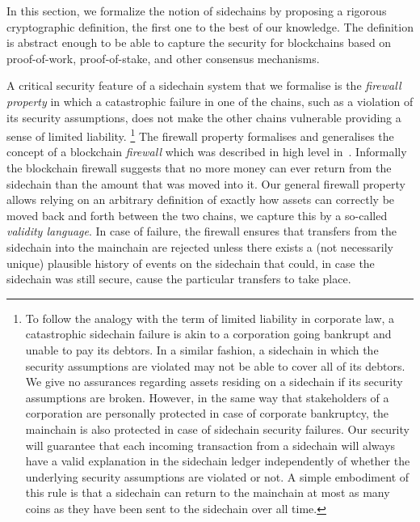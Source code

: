 In this section, we formalize the notion of sidechains by proposing a rigorous
cryptographic definition, the first one to the best of our knowledge. The
definition is abstract enough to be able to capture the security for blockchains
based on proof-of-work, proof-of-stake, and other consensus mechanisms.

A critical security feature of a  sidechain system that we formalise
is the \textit{firewall property} in
which a catastrophic failure in one of the chains, such as a violation of its
security assumptions, does not make the other chains vulnerable providing a
sense of limited liability.%
\footnote{To follow the analogy with the term of limited liability in corporate
law, a catastrophic sidechain failure is akin to a corporation going bankrupt
and unable to pay its debtors. In a similar fashion, a sidechain in which the
security assumptions are violated may not be able to cover all of its debtors.
We give no assurances regarding assets residing on a sidechain if its
security assumptions are broken.
 However, in the same way that stakeholders of a corporation are personally
protected in case of corporate bankruptcy, the mainchain is also protected in
case of sidechain security failures. Our security will guarantee that
each incoming transaction from a sidechain will always have a valid
explanation  in the sidechain ledger
independently of whether the underlying
security assumptions are violated or not. A simple embodiment of this rule
is that a sidechain can return to the mainchain at most as many coins as they have been sent to the sidechain over all time.
}
The   firewall property formalises and generalises the concept of a blockchain \textit{firewall} which was described in high level in~\cite{sidechains}. Informally the blockchain firewall suggests
that no more money can ever return from the sidechain than the amount that was moved
into it. Our general firewall property  allows relying on an
arbitrary definition of exactly how assets can correctly be moved back and forth
between the two chains, we capture this by a so-called
\textit{validity language}. In case of failure, the firewall
ensures that transfers from the sidechain into the mainchain are rejected unless
there exists a (not necessarily unique) plausible history of events on the sidechain that could, in case the
sidechain was still secure, cause the particular transfers to take place.

